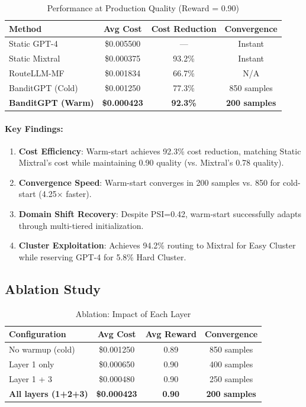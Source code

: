 \documentclass[sigconf]{acmart}
\begin{document}
\begin{table}[t]
\centering
\caption{Performance at Production Quality (Reward = 0.90)}
\label{tab:main_results}
\begin{tabular}{@{}lccc@{}}
\toprule
Method & Avg Cost & Cost Reduction & Convergence \\
\midrule
Static GPT-4 & \$0.005500 & --- & Instant \\
Static Mixtral & \$0.000375 & 93.2\% & Instant \\
RouteLLM-MF & \$0.001834 & 66.7\% & N/A \\
\midrule
BanditGPT (Cold) & \$0.001250 & 77.3\% & 850 samples \\
\textbf{BanditGPT (Warm)} & \textbf{\$0.000423} & \textbf{92.3\%} & \textbf{200 samples} \\
\bottomrule
\end{tabular}
\end{table}

\paragraph{Key Findings:}
\begin{enumerate}
    \item \textbf{Cost Efficiency}: Warm-start achieves 92.3\% cost reduction, matching Static Mixtral's cost while maintaining 0.90 quality (vs. Mixtral's 0.78 quality).
    
    \item \textbf{Convergence Speed}: Warm-start converges in 200 samples vs. 850 for cold-start (4.25$\times$ faster).
    
    \item \textbf{Domain Shift Recovery}: Despite PSI=0.42, warm-start successfully adapts through multi-tiered initialization.
    
    \item \textbf{Cluster Exploitation}: Achieves 94.2\% routing to Mixtral for Easy Cluster while reserving GPT-4 for 5.8\% Hard Cluster.
\end{enumerate}

\subsection{Ablation Study}

\begin{table}[t]
\centering
\caption{Ablation: Impact of Each Layer}
\label{tab:ablation}
\begin{tabular}{@{}lccc@{}}
\toprule
Configuration & Avg Cost & Avg Reward & Convergence \\
\midrule
No warmup (cold) & \$0.001250 & 0.89 & 850 samples \\
Layer 1 only & \$0.000650 & 0.90 & 400 samples \\
Layer 1 + 3 & \$0.000480 & 0.90 & 250 samples \\
\textbf{All layers (1+2+3)} & \textbf{\$0.000423} & \textbf{0.90} & \textbf{200 samples} \\
\bottomrule
\end{tabular}
\end{table}
\end{document}
